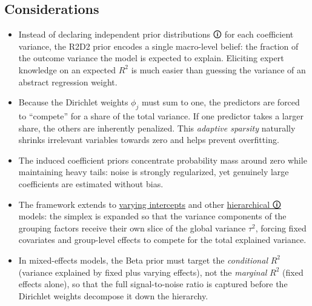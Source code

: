 \documentclass[
  letterpaper,
  DIV=11,
  numbers=noendperiod]{scrartcl}
\begin{document}
\subsection{Considerations}\label{considerations}

\begin{tcolorbox}[enhanced jigsaw, titlerule=0mm, arc=.35mm, leftrule=.75mm, colback=white, bottomtitle=1mm, toptitle=1mm, colbacktitle=quarto-callout-note-color!10!white, colframe=quarto-callout-note-color-frame, opacitybacktitle=0.6, bottomrule=.15mm, opacityback=0, toprule=.15mm, left=2mm, title=\textcolor{quarto-callout-note-color}{\faInfo}\hspace{0.5em}{Note}, rightrule=.15mm, breakable, coltitle=black]

\begin{itemize}
\item
  Instead of declaring independent \label{prior}{{prior
  distributions 🛈}} for each coefficient variance, the R2D2 prior
  encodes a single macro-level belief: the fraction of the outcome
  variance the model is expected to explain. Eliciting expert knowledge
  on an expected \(R^2\) is much easier than guessing the variance of an
  abstract regression weight.
\item
  Because the Dirichlet weights \(\phi_j\) must sum to one, the
  predictors are forced to ``compete'' for a share of the total
  variance. If one predictor takes a larger share, the others are
  inherently penalized. This \emph{adaptive sparsity} naturally shrinks
  irrelevant variables towards zero and helps prevent overfitting.
\item
  The induced coefficient priors concentrate probability mass around
  zero while maintaining heavy tails: noise is strongly regularized, yet
  genuinely large coefficients are estimated without bias.
\item
  The framework extends to
  \href{15.\%20Varying\%20intercepts.qmd}{varying intercepts} and other
  \href{15.\%20Varying\%20intercepts.qmd}{{hierarchical 🛈}} models: the
  simplex is expanded so that the variance components of the grouping
  factors receive their own slice of the global variance \(\tau^2\),
  forcing fixed covariates and group-level effects to compete for the
  total explained variance.
\item
  In mixed-effects models, the Beta prior must target the
  \emph{conditional} \(R^2\) (variance explained by fixed plus varying
  effects), not the \emph{marginal} \(R^2\) (fixed effects alone), so
  that the full signal-to-noise ratio is captured before the Dirichlet
  weights decompose it down the hierarchy.
\end{itemize}

\end{tcolorbox}
\end{document}
